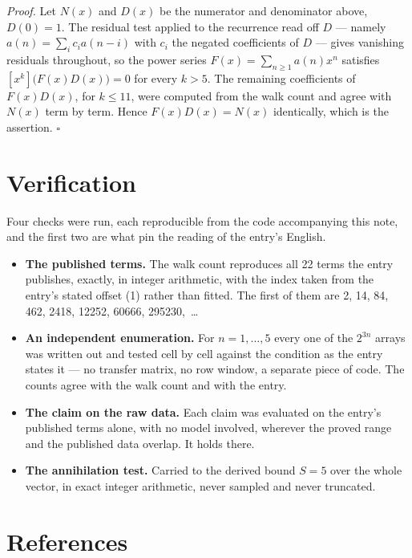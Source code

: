 \documentclass[11pt]{article}
\theoremstyle{definition}
\begin{document}
{\itshape Proof.} Let $N(x)$ and $D(x)$ be the numerator and denominator above, $D(0)=1$. The residual test applied to the recurrence read off $D$ --- namely $a(n) = \sum_i c_i a(n-i)$ with $c_i$ the negated coefficients of $D$ --- gives vanishing residuals throughout, so the power series $F(x)=\sum_{n\ge 1}a(n)x^n$ satisfies $[x^k]\bigl(F(x)D(x)\bigr) = 0$ for every $k > 5$. The remaining coefficients of $F(x)D(x)$, for $k \le 11$, were computed from the walk count and agree with $N(x)$ term by term. Hence $F(x)D(x) = N(x)$ identically, which is the assertion. $\square$

\section{Verification}

Four checks were run, each reproducible from the code accompanying this note, and the first two are what pin the reading of the entry's English.

\begin{itemize}

\item {\bfseries The published terms.} The walk count reproduces all 22 terms the entry publishes, exactly, in integer arithmetic, with the index taken from the entry's stated offset (1) rather than fitted. The first of them are 2, 14, 84, 462, 2418, 12252, 60666, 295230,~\dots

\item {\bfseries An independent enumeration.} For $n = 1,\dots,5$ every one of the $2^{3n}$ arrays was written out and tested cell by cell against the condition as the entry states it --- no transfer matrix, no row window, a separate piece of code. The counts agree with the walk count and with the entry.

\item {\bfseries The claim on the raw data.} Each claim was evaluated on the entry's published terms alone, with no model involved, wherever the proved range and the published data overlap. It holds there.

\item {\bfseries The annihilation test.} Carried to the derived bound $S = 5$ over the whole vector, in exact integer arithmetic, never sampled and never truncated.

\end{itemize}

\section{References}
\end{document}
